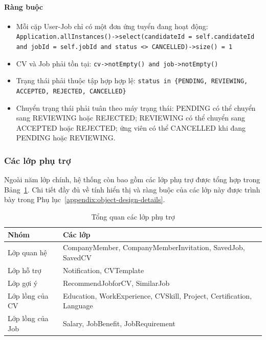 \paragraph{Ràng buộc}
\begin{itemize}
    \item Mỗi cặp User-Job chỉ có một đơn ứng tuyển đang hoạt động: \texttt{Application.allInstances()->select(candidateId = self.candidateId and jobId = self.jobId and status <> CANCELLED)->size() = 1}
    \item CV và Job phải tồn tại: \texttt{cv->notEmpty() and job->notEmpty()}
    \item Trạng thái phải thuộc tập hợp hợp lệ: \texttt{status in \{PENDING, REVIEWING, ACCEPTED, REJECTED, CANCELLED\}}
    \item Chuyển trạng thái phải tuân theo máy trạng thái: PENDING có thể chuyển sang REVIEWING hoặc REJECTED; REVIEWING có thể chuyển sang ACCEPTED hoặc REJECTED; ứng viên có thể CANCELLED khi đang PENDING hoặc REVIEWING.
\end{itemize}

\subsubsection{Các lớp phụ trợ}

Ngoài năm lớp chính, hệ thống còn bao gồm các lớp phụ trợ được tổng hợp trong Bảng~\ref{tab:supporting-classes}. Chi tiết đầy đủ về tính hiển thị và ràng buộc của các lớp này được trình bày trong Phụ lục~\ref{appendix:object-design-details}.

\begin{table}[H]
\centering
\caption{Tổng quan các lớp phụ trợ}
\label{tab:supporting-classes}
\small
\begin{tabularx}{\textwidth}{|l|X|}
\hline
\textbf{Nhóm} & \textbf{Các lớp} \\
\hline
Lớp quan hệ & CompanyMember, CompanyMemberInvitation, SavedJob, SavedCV \\
\hline
Lớp hỗ trợ & Notification, CVTemplate \\
\hline
Lớp gợi ý & RecommendJobforCV, SimilarJob \\
\hline
Lớp lồng của CV & Education, WorkExperience, CVSkill, Project, Certification, Language \\
\hline
Lớp lồng của Job & Salary, JobBenefit, JobRequirement \\
\hline
\end{tabularx}
\end{table}
